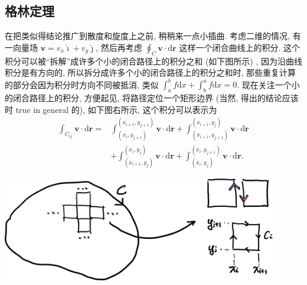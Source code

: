 \subsection{格林定理}

在把类似得结论推广到散度和旋度上之前, 稍稍来一点小插曲. 考虑二维的情况,
有一向量场 $\boldsymbol{v}=v_x\hat{\imath}+v_y\hat{\jmath}$,
然后再考虑 $\oint_C\boldsymbol{v}\cdot\mathrm{d}\boldsymbol{r}$
这样一个闭合曲线上的积分.
这个积分可以被``拆解''成许多个小的闭合路径上的积分之和 (如下图所示) ,
因为沿曲线积分是有方向的, 所以拆分成许多个小的闭合路径上的积分之和时,
那些重复计算的部分会因为积分时方向不同被抵消, 类似
$\int_a^bf\mathrm{d}x+\int_b^af\mathrm{d}x=0$.
现在关注一个小的闭合路径上的积分, 方便起见, 将路径定位一个矩形边界
(当然, 得出的结论应该时 true in general 的), 如下图右所示,
这个积分可以表示为 \[
\begin{aligned}
\int_{C_{ij}}\boldsymbol{v}\cdot\mathrm{d}\boldsymbol{r}=&\int_{(x_i,y_{j+1})
}^{(x_{i+1},y_{j+1})}\boldsymbol{v}\cdot\mathrm{d}\boldsymbol{r}+\int_{(x_{i+1},y_{j+1})
}^{(x_{i+1},y_j)}\boldsymbol{v}\cdot\mathrm{d}\boldsymbol{r}\\
&+\int_{(x_{i+1},y_j)
}^{(x_i,y_j)}\boldsymbol{v}\cdot\mathrm{d}\boldsymbol{r}+\int_{(x_i,y_j)
}^{(x_i,y_{j+1})}\boldsymbol{v}\cdot\mathrm{d}\boldsymbol{r}.
\end{aligned}
\] 

\begin{tcolorbox}[size=fbox, breakable, enhanced jigsaw]
    \includegraphics[width=0.9\textwidth]{./img/image-20240604044203628.png}
\end{tcolorbox}

